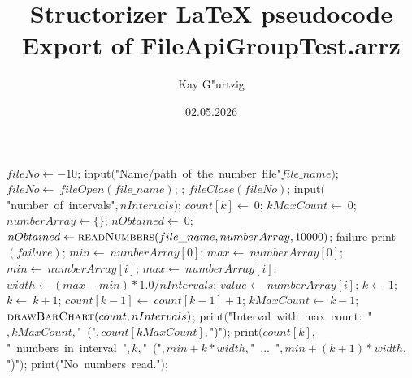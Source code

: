 \documentclass[a4paper,10pt]{article}
\title{Structorizer LaTeX pseudocode Export of FileApiGroupTest.arrz}
\author{Kay G"urtzig}
\date{02.05.2026}
\begin{document}
\begin{algorithm}
\caption{DrawRandomHistogram}
\begin{algorithmic}[5]
\State {}
\State {}
  \State \(fileNo\gets-10\);
  \Repeat
    \State \(\)input\((\)"{}Name/path\ of\ the\ number\ file"{}\(file\_name)\);
    \State \(fileNo\gets\ fileOpen(file\_name)\);
  ;
    \State \(fileClose(fileNo)\);
    \State \(\)input\((\)"{}number\ of\ intervals"{}\(,nIntervals)\);
      \State \(count[k]\gets\ 0\);
    \EndFor
    \State \(kMaxCount\gets\ 0\);
    \State \(numberArray\gets\{\}\);
    \State \(nObtained\gets\ 0\);
    \Try
      \State \(nObtained\gets\Call{readNumbers}{file\_name,numberArray,10000}\);
    \EndTry
    \Catch failure
      \State \(\)print\((failure)\);
    \EndCatch %
      \State \(min\gets\ numberArray[0]\);
      \State \(max\gets\ numberArray[0]\);
          \State \(min\gets\ numberArray[i]\);
        \Else
            \State \(max\gets\ numberArray[i]\);
          \EndIf
        \EndIf
      \EndFor
      \State \(width\gets(max-min)*1.0/nIntervals\);
        \State \(value\gets\ numberArray[i]\);
        \State \(k\gets\ 1\);
          \State \(k\gets\ k+1\);
        \EndWhile
        \State \(count[k-1]\gets\ count[k-1]+1\);
          \State \(kMaxCount\gets\ k-1\);
        \EndIf
      \EndFor
      \State \(\Call{drawBarChart}{count,nIntervals}\);
      \State \(\)print\((\)"{}Interval\ with\ max\ count:\ "{}\(,kMaxCount,\)"{}\ ("{}\(,count[kMaxCount],\)"{})"{}\()\);
        \State \(\)print\((count[k],\)"{}\ numbers\ in\ interval\ "{}\(,k,\)"{}\ ("{}\(,min+k*width,\)"{}\ ...\ "{}\(,min+(k+1)*width,\)"{})"{}\()\);
      \EndFor
    \Else
      \State \(\)print\((\)"{}No\ numbers\ read."{}\()\);
    \EndIf
  \EndIf
\EndProcedure
\end{algorithmic}
\end{algorithm}
\end{document}
